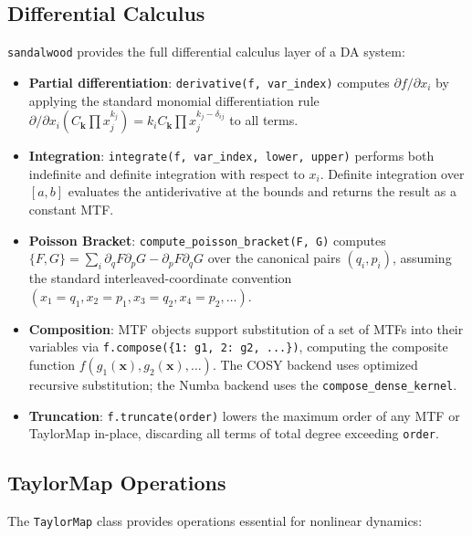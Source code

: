 \documentclass[aps,prb,reprint,superscriptaddress,nofootinbib]{revtex4-2}
\begin{document}
\subsection{Differential Calculus}

\texttt{sandalwood} provides the full differential calculus layer of a DA system:

\begin{itemize}
    \item \textbf{Partial differentiation}: \texttt{derivative(f, var\_index)} computes $\partial f/\partial x_i$ by applying the standard monomial differentiation rule $\partial/\partial x_i\left(C_{\mathbf{k}}\prod x_j^{k_j}\right) = k_i C_{\mathbf{k}} \prod x_j^{k_j - \delta_{ij}}$ to all terms.
    \item \textbf{Integration}: \texttt{integrate(f, var\_index, lower, upper)} performs both indefinite and definite integration with respect to $x_i$. Definite integration over $[a,b]$ evaluates the antiderivative at the bounds and returns the result as a constant MTF.
    \item \textbf{Poisson Bracket}: \texttt{compute\_poisson\_bracket(F, G)} computes $\{F, G\} = \sum_i \partial_q F \partial_p G - \partial_p F \partial_q G$ over the canonical pairs $(q_i, p_i)$, assuming the standard interleaved-coordinate convention $(x_1=q_1, x_2=p_1, x_3=q_2, x_4=p_2, \ldots)$.
    \item \textbf{Composition}: MTF objects support substitution of a set of MTFs into their variables via \texttt{f.compose(\{1: g1, 2: g2, ...\})}, computing the composite function $f(g_1(\mathbf{x}), g_2(\mathbf{x}), \ldots)$. The COSY backend uses optimized recursive substitution; the Numba backend uses the \texttt{compose\_dense\_kernel}.
    \item \textbf{Truncation}: \texttt{f.truncate(order)} lowers the maximum order of any MTF or TaylorMap in-place, discarding all terms of total degree exceeding \texttt{order}.
\end{itemize}

\subsection{TaylorMap Operations}

The \texttt{TaylorMap} class provides operations essential for nonlinear dynamics:
\end{document}
